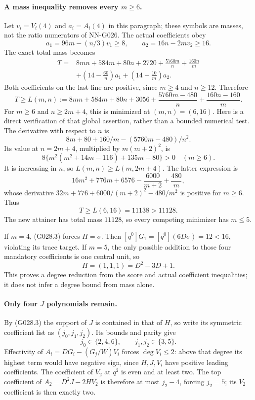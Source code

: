\paragraph{A mass inequality removes every $m\ge6$.}
Let $v_i=V_i(4)$ and $a_i=A_i(4)$ in this paragraph;
these symbols are masses, not the ratio numerators of
NN-G026. The actual coefficients obey
\[
 a_1=96m-(n/3)v_1\ge8,\qquad
 a_2=16n-2mv_2\ge16.
\]
The exact total mass becomes
\[
 \begin{split}
 T={}&8mn+584m+80n+2720+
       \frac{5760m}{n}+\frac{160n}{m}\\
    &+\left(14-\frac{60}{n}\right)a_1
       +\left(14-\frac{10}{m}\right)a_2.
 \end{split}                                                        \tag{G028.4}
\]
Both coefficients on the last line are positive,
since $m\ge4$ and $n\ge12$. Therefore
\[
 T\ge L(m,n):=8mn+584m+80n+3056
       +\frac{5760m-480}{n}+\frac{160n-160}{m}.       \tag{G028.5}
\]
For $m\ge6$ and $n\ge2m+4$, this is minimized at
$(m,n)=(6,16)$. Here is a direct verification of that
global assertion, rather than a bounded numerical test.
The derivative with respect to $n$ is
\[
 8m+80+160/m-(5760m-480)/n^2.
\]
Its value at $n=2m+4$, multiplied by $m(m+2)^2$,
is
\[
 8\{m^2(m^2+14m-116)+135m+80\}>0
 \quad(m\ge6).
\]
It is increasing in $n$, so $L(m,n)\ge L(m,2m+4)$.
The latter expression is
\[
 16m^2+776m+6576-\frac{6000}{m+2}+\frac{480}{m},
\]
whose derivative
$32m+776+6000/(m+2)^2-480/m^2$ is positive for
$m\ge6$. Thus
\[
 T\ge L(6,16)=11138>11128.                          \tag{G028.6}
\]
The new attainer has total mass $11128$, so every
competing minimizer has $m\le5$.

If $m=4$, (G028.3) forces $H=\sigma$.
Then $[q^0]G_1=[q^0](6D\sigma)=12<16$, violating
its trace target. If $m=5$, the only possible addition
to those four mandatory coefficients is one central
unit, so
\[
 H=(1,1,1)=D^2-3D+1.                                \tag{G028.7}
\]
This proves a degree reduction from the score and
actual coefficient inequalities; it does not infer
a degree bound from mass alone.

\paragraph{Only four $J$ polynomials remain.}
By (G028.3) the support of $J$ is contained in that
of $H$, so write its symmetric coefficient list as
$(j_0,j_1,j_2)$. Its bounds and parity give
\[
 j_0\in\{2,4,6\},\qquad j_1,j_2\in\{3,5\}.
\]
Effectivity of $A_i=DG_i-(G_j/W)V_i$ forces
$\deg V_i\le2$: above that degree its highest term
would have negative sign, since $H,J,V_i$ have
positive leading coefficients. The coefficient of
$V_2$ at $q^2$ is even and at least two. The top
coefficient of $A_2=D^2J-2HV_2$ is therefore at most
$j_2-4$, forcing $j_2=5$; its $V_2$ coefficient is
then exactly two.

